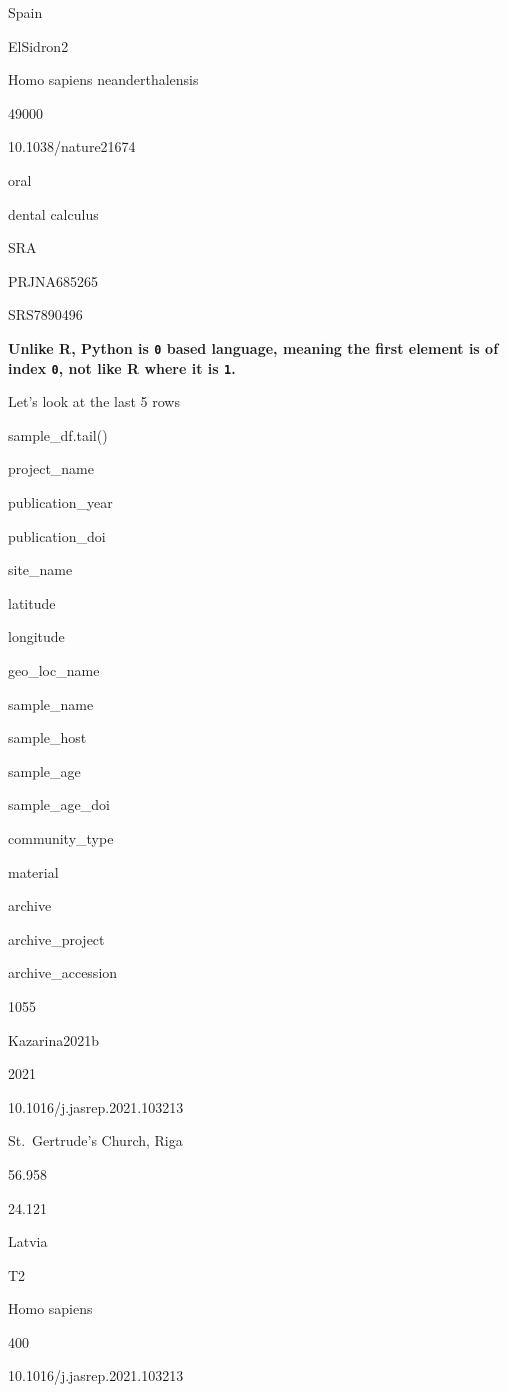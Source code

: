 \documentclass[
  letterpaper,
]{book}
\newenvironment{Shaded}{}{}
\newcommand{\NormalTok}[1]{\textcolor[rgb]{0.14,0.16,0.18}{#1}}
\begin{document}
Spain

ElSidron2

Homo sapiens neanderthalensis

49000

10.1038/nature21674

oral

dental calculus

SRA

PRJNA685265

SRS7890496

\textbf{Unlike R, Python is \texttt{0} based language, meaning the first
element is of index \texttt{0}, not like R where it is \texttt{1}.}

Let's look at the last 5 rows

\begin{Shaded}
\begin{Highlighting}[]
\NormalTok{sample\_df.tail()}
\end{Highlighting}
\end{Shaded}

project\_name

publication\_year

publication\_doi

site\_name

latitude

longitude

geo\_loc\_name

sample\_name

sample\_host

sample\_age

sample\_age\_doi

community\_type

material

archive

archive\_project

archive\_accession

1055

Kazarina2021b

2021

10.1016/j.jasrep.2021.103213

St.~Gertrude's Church, Riga

56.958

24.121

Latvia

T2

Homo sapiens

400

10.1016/j.jasrep.2021.103213
\end{document}
